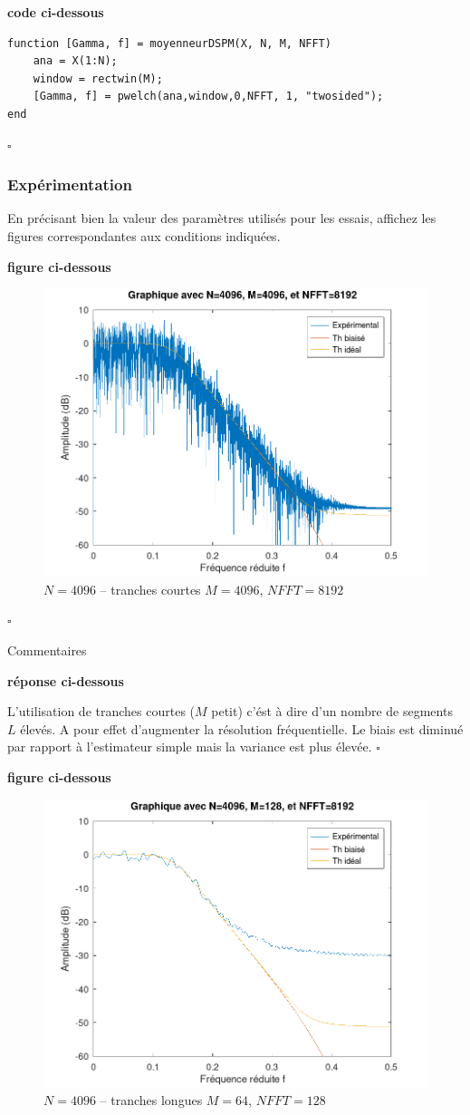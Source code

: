 \documentclass{article}
\newcommand{\debutrep}[1]{\color{blue}\begin{center} \hrulefill \textbf{ #1 } \hrulefill \end{center} }
\newcommand{\finrep}{\vspace*{5mm}\hfill $\square$\color{black}\vspace*{5mm}}
\begin{document}
\debutrep{code ci-dessous}
\begin{verbatim}
function [Gamma, f] = moyenneurDSPM(X, N, M, NFFT)
    ana = X(1:N);
    window = rectwin(M);
    [Gamma, f] = pwelch(ana,window,0,NFFT, 1, "twosided");
end
\end{verbatim}
\finrep


\subsubsection{Expérimentation}

En précisant bien la valeur des paramètres utilisés pour les essais, affichez les figures correspondantes aux conditions indiquées.
\debutrep{figure ci-dessous}

\begin{figure}[H]
\centering
\includegraphics[width=0.75\columnwidth]{Variation-M-moyenneur.png}
\caption{$N=4096$ -- tranches courtes $M = 4096$, $NFFT = 8192$}
\end{figure}
\finrep

Commentaires
\debutrep{réponse ci-dessous}
L'utilisation de tranches courtes ($M$ petit) c'ést à dire d'un nombre de segments $L$ élevés. A pour effet d'augmenter la résolution fréquentielle. Le biais est diminué par rapport à l'estimateur simple mais la variance est plus élevée.
\finrep

\debutrep{figure ci-dessous}
\begin{figure}[H]
\centering
\includegraphics[width=0.75\columnwidth]{Variation-M-moyenneur-2.png}
\caption{$N=4096$ -- tranches longues $M = 64$, $NFFT = 128$}
\end{figure}
\end{document}
